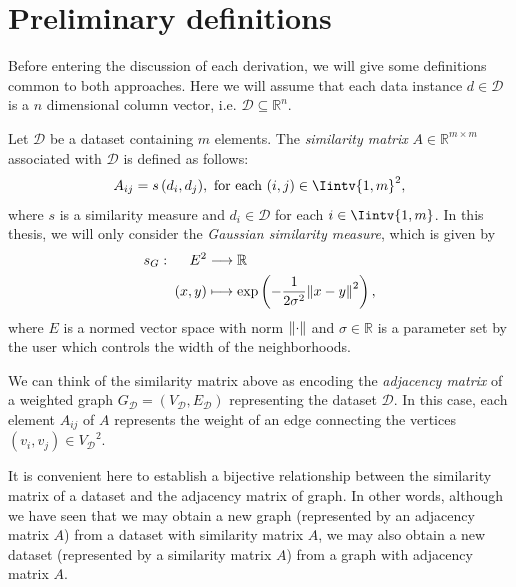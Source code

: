 \section{Preliminary definitions} 
Before entering the discussion of each derivation, we will give some definitions common to both approaches.
Here we will assume that each data instance $d \in \mathcal D$ is a $n$ dimensional column vector, i.e. $\mathcal D \subseteq \mathbb R^{n }$.

\begin{definition}
   Let $\mathcal D$ be a dataset containing $m$ elements. The \textit{similarity matrix} $A \in \mathbb{R}^{m \times m}$ associated with $\mathcal D$ is defined as follows: 
   \begin{equation}
      A_{ij} = s\,(d_i,d_j), \text{ for each } (i,j) \in \Iintv{1,m}^2,
   \end{equation}
   where $s$ is a similarity measure and $d_i \in \mathcal D$ for each $i \in \Iintv{1,m}$.
   In this thesis, we will only consider the \textit{Gaussian similarity measure}, which is given by 
   \begin{equation}
      \begin{split}
         s_G:\,\,\,\,\,\,\,\,   E^2  &\longrightarrow \mathbb R  \\
          (x, y) & \longmapsto \exp \left( -\frac{1}{2 \sigma ^2} {\left\lVert x - y\right\rVert}^2 \right),
      \end{split}
   \end{equation}
   where $E$ is a normed vector space with norm $\left\lVert\cdot\right\rVert$ and $\sigma \in \mathbb R$ is a parameter set by the user which controls the width of the neighborhoods.
\end{definition}

We can think of the similarity matrix above as encoding the \textit{adjacency matrix} of a weighted graph $G_{\mathcal D} = (V_{\mathcal D}, E_{\mathcal D})$ representing the dataset $\mathcal D$. 
In this case, each element $A_{ij}$ of $A$ represents the weight of an edge connecting the vertices $(v_i, v_j) \in {V_{\mathcal D}}^2$.

\begin{remark}
It is convenient here to establish a bijective relationship between the similarity matrix of a dataset and the adjacency matrix of graph.
   In other words, although we have seen that we may obtain a new graph (represented by an adjacency matrix $A$) from a dataset with similarity matrix $A$, we may also obtain a new dataset (represented by a similarity matrix $A$) from a graph with adjacency matrix $A$.
\end{remark}

